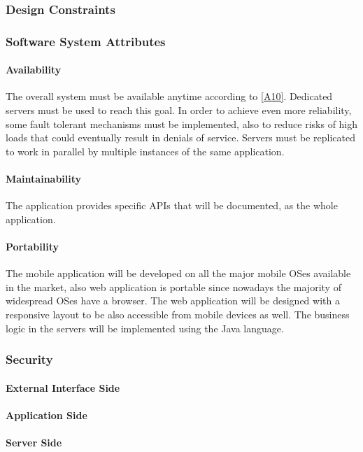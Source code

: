 \documentclass[a4paper,12pt]{article}%
\begin{document}
\subsubsection{Design Constraints}
\subsubsection{Software System Attributes}
\paragraph{Availability} The overall system must be available anytime according to \hyperref[a10]{[A10]}. Dedicated servers must be used to reach this goal. In order to achieve even more reliability, some fault tolerant mechanisms must be implemented, also to reduce risks of high loads that could eventually result in denials of service. Servers must be replicated to work in parallel by multiple instances of the same application. 
\paragraph{Maintainability} The application provides specific APIs that will be documented, as the whole application.
\paragraph{Portability} The mobile application will be developed on all the major mobile OSes available in the market, also web application is portable since nowadays the majority of widespread OSes have a browser. The web application will be designed with a responsive layout to be also accessible from mobile devices as well. The business logic in the servers will be implemented using the Java language.
\subsubsection{Security}
\paragraph{External Interface Side}
\paragraph{Application Side}
\paragraph{Server Side}
\end{document}
